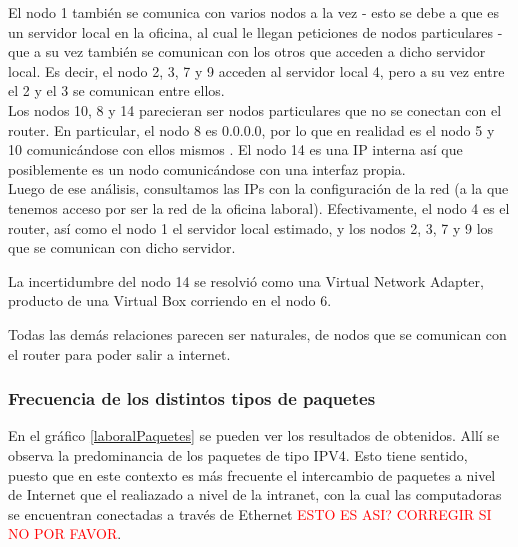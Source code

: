 El nodo 1 tambi\'en se comunica con varios nodos a la vez - esto se debe a que es un servidor local en la oficina, al cual le llegan peticiones de nodos particulares - que a su vez tambi\'en se comunican con los otros que acceden a dicho servidor local. Es decir, el nodo 2, 3, 7 y 9 acceden al servidor local 4, pero a su vez entre el 2 y el 3 se comunican entre ellos.\\

Los nodos 10, 8 y 14 parecieran ser nodos particulares que no se conectan con el router. En particular, el nodo 8 es 0.0.0.0, por lo que en realidad es el nodo 5 y 10 comunic\'andose con ellos mismos . El nodo 14 es una IP interna as\'i que posiblemente es un nodo comunic\'andose con una interfaz propia.\\

Luego de ese an\'alisis, consultamos las IPs con la configuraci\'on de la red (a la que tenemos acceso por ser la red de la oficina laboral). Efectivamente, el nodo 4 es el router, as\'i como el nodo 1 el servidor local estimado, y los nodos 2, 3, 7 y 9 los que se comunican con dicho servidor.

La incertidumbre del nodo 14 se resolvi\'o como una Virtual Network Adapter, producto de una Virtual Box corriendo en el nodo 6.

Todas las dem\'as relaciones parecen ser naturales, de nodos que se comunican con el router para poder salir a internet.

\subsubsection{Frecuencia de los distintos tipos de paquetes}

En el gr\'afico \ref{laboralPaquetes} se pueden ver los resultados de obtenidos. All\'i se observa la predominancia de los paquetes de tipo IPV4. Esto tiene sentido, puesto que en este contexto es m\'as frecuente el intercambio de paquetes a nivel de Internet que el realiazado a nivel de la intranet, con la cual las computadoras se encuentran conectadas a trav\'es de Ethernet \textcolor{red}{ESTO ES ASI? CORREGIR SI NO POR FAVOR}.

